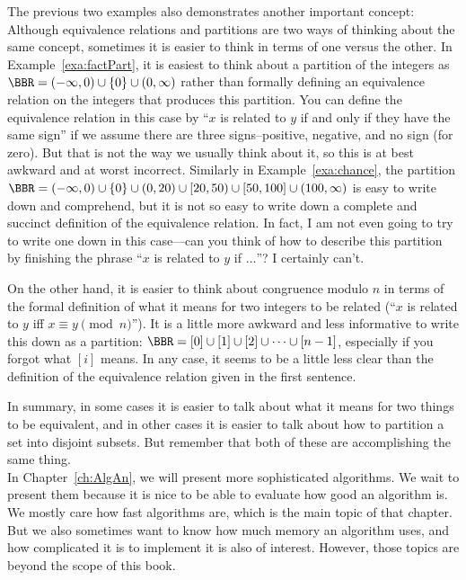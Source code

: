 The previous two examples also demonstrates another 
important concept: Although equivalence relations and partitions
are two ways of thinking about the same concept, 
sometimes it is easier to think in terms of one versus the other. 
In Example~\ref{exa:factPart}, it is easiest to think about a
partition of the integers as 
$\BBR=(-\infty,0)\cup\{0\}\cup(0,\infty)$ rather than
formally defining an equivalence relation
on the integers that produces this partition.
You can define the equivalence relation in this case by ``$x$ is related to $y$ if and only if they have the same sign'' if we assume there are
three signs--positive, negative, and no sign (for zero). But that is not the way we usually think about it, so this is at best awkward and at worst incorrect.
Similarly in Example~\ref{exa:chance}, 
the partition $\BBR=(-\infty,0)\cup\{0\}\cup(0,20)\cup[20,50)\cup[50,100]\cup(100,\infty)$ is easy to write down and comprehend,
but it is not so easy to write down a complete and succinct definition of 
the equivalence relation. In fact, I am not even going to try to write
one down in this case---can you think of how to describe this partition
by finishing the phrase ``$x$ is related to $y$ if $\ldots$''? I certainly can't.

On the other hand, 
it is easier to think about congruence modulo $n$ in terms of the 
formal definition of what it means for two integers to be related 
(``$x$ is related to $y$ iff $x\equiv y\pmod n$'').
It is a little more awkward and less informative to write this down as
a partition: $\BBR=[0]\cup[1]\cup[2]\cup\cdots\cup[n-1]$,
especially if you forgot what $[i]$ means.
In any case, it seems to be a little less clear than the definition of the 
equivalence relation given in the first sentence.

In summary, 
in some cases it is easier to talk about what it means for two things to be equivalent, 
and in other cases it is easier to talk about how to partition a set into disjoint subsets. 
But remember that both of these are accomplishing the same thing.\\

In Chapter~\ref{ch:AlgAn}, we will present more sophisticated
algorithms. We wait to present them because it is nice to be able
to evaluate how good an algorithm is. 
We mostly care how fast algorithms are, which is the main topic
of that chapter. But we also sometimes want to know
how much memory an algorithm uses, and how complicated it
is to implement it is also of interest. 
However, those topics are beyond the
scope of this book.

